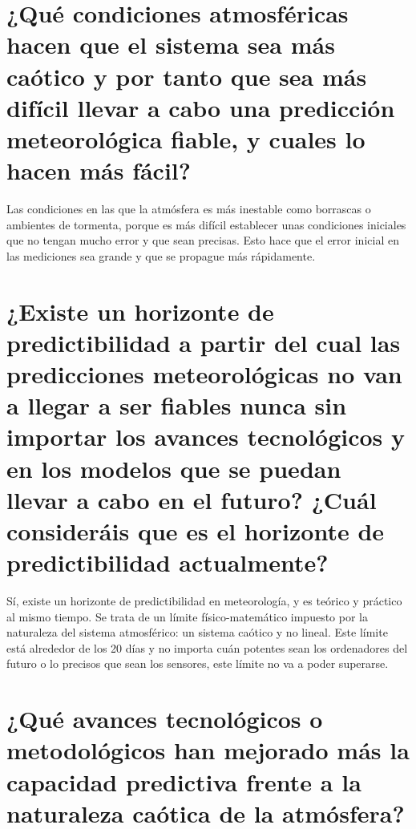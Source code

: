 \documentclass[
  10pt,
  a4paper,
  DIV=11,
  numbers=noendperiod,
  open=any]{scrreprt}
\numberwithin{equation}{chapter}
\numberwithin{equation}{section}
\renewcommand{\[}{\begin{equation}}
\renewcommand{\]}{\end{equation}}
\begin{document}
\section{¿Qué condiciones atmosféricas hacen que el sistema sea más
caótico y por tanto que sea más difícil llevar a cabo una predicción
meteorológica fiable, y cuales lo hacen más
fácil?}\label{quuxe9-condiciones-atmosfuxe9ricas-hacen-que-el-sistema-sea-muxe1s-cauxf3tico-y-por-tanto-que-sea-muxe1s-difuxedcil-llevar-a-cabo-una-predicciuxf3n-meteoroluxf3gica-fiable-y-cuales-lo-hacen-muxe1s-fuxe1cil}

Las condiciones en las que la atmósfera es más inestable como borrascas
o ambientes de tormenta, porque es más difícil establecer unas
condiciones iniciales que no tengan mucho error y que sean precisas.
Esto hace que el error inicial en las mediciones sea grande y que se
propague más rápidamente.

\section{¿Existe un horizonte de predictibilidad a partir del cual las
predicciones meteorológicas no van a llegar a ser fiables nunca sin
importar los avances tecnológicos y en los modelos que se puedan llevar
a cabo en el futuro? ¿Cuál consideráis que es el horizonte de
predictibilidad
actualmente?}\label{existe-un-horizonte-de-predictibilidad-a-partir-del-cual-las-predicciones-meteoroluxf3gicas-no-van-a-llegar-a-ser-fiables-nunca-sin-importar-los-avances-tecnoluxf3gicos-y-en-los-modelos-que-se-puedan-llevar-a-cabo-en-el-futuro-cuuxe1l-consideruxe1is-que-es-el-horizonte-de-predictibilidad-actualmente}

Sí, existe un horizonte de predictibilidad en meteorología, y es teórico
y práctico al mismo tiempo. Se trata de un límite físico-matemático
impuesto por la naturaleza del sistema atmosférico: un sistema caótico y
no lineal. Este límite está alrededor de los 20 días y no importa cuán
potentes sean los ordenadores del futuro o lo precisos que sean los
sensores, este límite no va a poder superarse.

\section{¿Qué avances tecnológicos o metodológicos han mejorado más la
capacidad predictiva frente a la naturaleza caótica de la
atmósfera?}\label{quuxe9-avances-tecnoluxf3gicos-o-metodoluxf3gicos-han-mejorado-muxe1s-la-capacidad-predictiva-frente-a-la-naturaleza-cauxf3tica-de-la-atmuxf3sfera}
\end{document}

